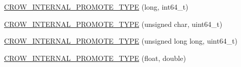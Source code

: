 \begin{DoxyCompactItemize}
\item 
\hyperlink{namespacecrow_1_1black__magic_a8843fa0826d71d2f9f727287d66bc880}{C\-R\-O\-W\-\_\-\-I\-N\-T\-E\-R\-N\-A\-L\-\_\-\-P\-R\-O\-M\-O\-T\-E\-\_\-\-T\-Y\-P\-E} (long, int64\-\_\-t)
\item 
\hyperlink{namespacecrow_1_1black__magic_a1d0c48ef972ed37e08bc3dd51c0e1a5e}{C\-R\-O\-W\-\_\-\-I\-N\-T\-E\-R\-N\-A\-L\-\_\-\-P\-R\-O\-M\-O\-T\-E\-\_\-\-T\-Y\-P\-E} (unsigned char, uint64\-\_\-t)
\item 
\hyperlink{namespacecrow_1_1black__magic_a647ab28f6adf3f5f2f662aeaa55c27ae}{C\-R\-O\-W\-\_\-\-I\-N\-T\-E\-R\-N\-A\-L\-\_\-\-P\-R\-O\-M\-O\-T\-E\-\_\-\-T\-Y\-P\-E} (unsigned long long, uint64\-\_\-t)
\item 
\hyperlink{namespacecrow_1_1black__magic_ac394c9690152b3c72d53d613694adf98}{C\-R\-O\-W\-\_\-\-I\-N\-T\-E\-R\-N\-A\-L\-\_\-\-P\-R\-O\-M\-O\-T\-E\-\_\-\-T\-Y\-P\-E} (float, double)
\end{DoxyCompactItemize}


